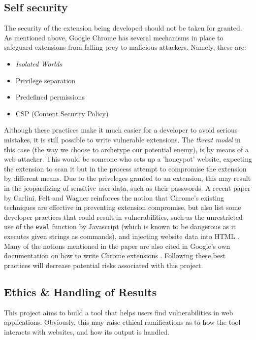 \subsection{Self security}
The security of the extension being developed should not be taken for granted. As mentioned above, Google Chrome has several mechanisms in place to safeguard extensions from falling prey to malicious attackers. Namely, these are:
\begin{itemize}
	\item \textit{Isolated Worlds}
	\item Privilege separation
	\item Predefined permissions
	\item CSP (Content Security Policy)
\end{itemize} 
Although these practices make it much easier for a developer to avoid serious mistakes, it is still possible to write vulnerable extensions. The \textit{threat model} in this case (the way we choose to archetype our potential enemy), is by means of a web attacker. This would be someone who sets up a 'honeypot' website, expecting the extension to scan it but in the process attempt to compromise the extension by different means. Due to the priveleges granted to an extension, this may result in the jeopardizing of sensitive user data, such as their passwords. A recent paper by Carlini, Felt and Wagner reinforces the notion that Chrome's existing techniques are effective in preventing extension compromise, but also list some developer practices that could result in vulnerabilities, such as the unrestricted use of the \texttt{eval} function by Javascript (which is known to be dangerous as it executes given strings as commands), and injecting website data into HTML \cite{evalChromeExtensionSecurityArchitecture}. Many of the notions mentioned in the paper are also cited in Google's own documentation on how to write Chrome extensions \cite{chromeExtensionArchitecture}. Following these best practices will decrease potential risks associated with this project. \\ 

\subsection{Ethics \& Handling of Results}
\label{ethics}
This project aims to build a tool that helps users find vulnerabilities in web applications. Obviously, this may raise ethical ramifications as to how the tool interacts with websites, and how its output is handled. \\

